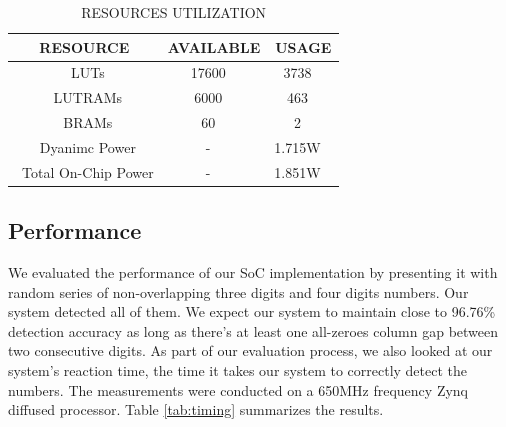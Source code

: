 \documentclass[sigconf]{acmart}
\theoremstyle{plain}
\theoremstyle{remark}
\begin{document}
\begin{table} [H] 
\caption{RESOURCES UTILIZATION} \label{tab:resources}
\begin{minipage}[b]{\linewidth}
\renewcommand{\arraystretch}{0.6}
\addtolength{\tabcolsep}{-2.7pt}
\renewcommand{\thefootnote}{\thempfootnote}
\renewcommand{\thempfootnote}{\fnsymbol{mpfootnote}}
\begin{center}
\begin{tabular}{ c | c | c  }
 \textbf {RESOURCE} & \textbf{AVAILABLE} & \textbf {USAGE}\\
\midrule
\midrule
\ LUTs             &    17600      \ & 3738      \ \\
\ LUTRAMs          &    6000       \ & 463       \ \\
\ BRAMs            &    60         \ & 2        \ \\
\ Dyanimc Power    &    -          \ & 1.715W    \ \\

\ Total On-Chip Power     &    -   \ & 1.851W    \ \\
\end{tabular}
\end{center}
\end{minipage}
\end{table}

\subsection{Performance}

We evaluated the performance of our SoC implementation by presenting it with random series of non-overlapping three digits and four digits numbers. Our system detected all of them. We expect our system to maintain close to 96.76\% detection accuracy as long as there's at least one all-zeroes column gap between two consecutive digits.  As part of our evaluation process, we also looked at our system's reaction time, the time it takes our system to correctly detect the numbers. The measurements were conducted on a 650MHz frequency Zynq diffused processor. Table \ref{tab:timing} summarizes the results. 
\end{document}
